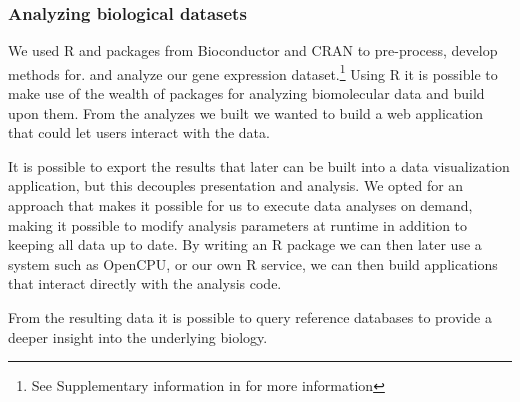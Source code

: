 \subsubsection*{Analyzing biological datasets} 
We used R and packages from Bioconductor and CRAN to pre-process, develop
methods for. and analyze our gene expression dataset.\footnote{See Supplementary
information in \cite{mixt} for more information} Using R it is possible to make
use of the wealth of packages for analyzing biomolecular data and build upon
them. From the analyzes we built we wanted to build a web application that could
let users interact with the data. 

It is possible to export the results that later can be built into
a data visualization application, but this decouples presentation and
analysis. We opted for an approach that makes it possible for us to execute data
analyses on demand, making it possible to modify analysis parameters at runtime
in addition to keeping all data up to date. By writing an R package we can then
later use a system such as OpenCPU, or our own R service, we can then build
applications that interact directly with the analysis code. 


From the resulting data it is possible to query reference databases to provide a
deeper insight into the underlying biology. 


